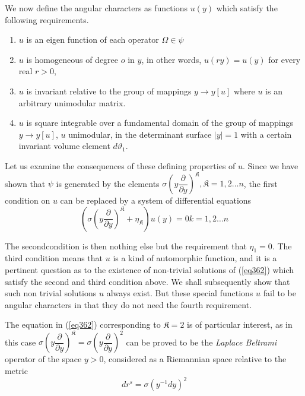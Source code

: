 We now define the angular characters as functions $u(y)$ which satisfy
the following requirements. 
\begin{enumerate}[(1)]
\item $u$ is an eigen function of each operator $\Omega \in
  \psi$ 

\item $u$ is homogeneous of degree $o$ in $y$, in other words, $u (r
  y) = u (y)$ for every real $r > 0$, 

\item $u$ is invariant relative to the group of mappings $y
  \rightarrow y [u]$ where $u$ is an arbitrary unimodular matrix. 

\item $u$ is square integrable over a fundamental domain of the group
  of mappings $y \to y [u]$, $u$ unimodular, in the determinant surface
  $|y| = 1$ with a certain invariant volume element $d \vartheta_1$.  
\end{enumerate}

Let us examine the consequences of these defining properties of
$u$. Since we have shown that $\psi$ is generated by the
elements $\sigma (y \dfrac{\partial}{\partial y})^\mathfrak{K},
\mathfrak{K} = 1,2 \ldots n$, the first condition on $u$ can be
replaced by a system of differential equations 
\begin{equation*}
(\sigma (y \frac{\partial}{\partial y})^\mathfrak{K} +
  \eta_\mathfrak{K}) u(y) = 0 k= 1,2 \ldots n \tag{362}\label{eq362} 
\end{equation*}

The second\pageoriginale condition is then nothing else but the
requirement that 
$\eta_1 = 0$. The third condition means that $u$ is a kind of
automorphic function, and it is a pertinent question as to the
existence of non-trivial solutions of (\ref{eq362}) which satisfy the second
and third condition above. We shall subsequently show that such non
trivial solutions $u$ always exist. But these special functions $u$
fail to be angular characters in that they do not need the fourth
requirement.	 

The equation in (\ref{eq362}) corresponding to $\mathfrak{K} = 2$ is of
particular interest, as in this case $\sigma(y
\dfrac{\partial}{\partial y})^\mathfrak{K} = \sigma (y
\dfrac{\partial}{\partial y})^2$ can be proved to be the
\textit{Laplace Beltrami} operator of the space $y > 0$, considered as
a Riemannian space relative to the metric  
\begin{equation*}
d r^s = \sigma (y^{-1} d y)^2 \tag{363}\label{eq363}
\end{equation*}

